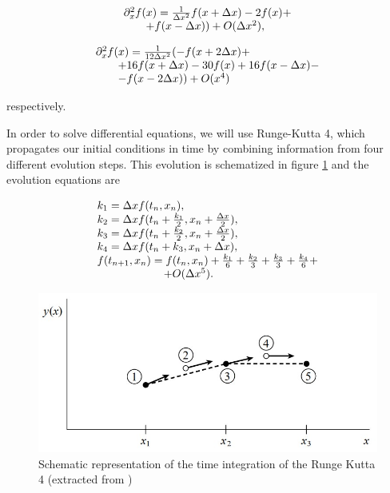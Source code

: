 \begin{align}
    \begin{array}{@{}l@{}}
        \partial_x^2 f(x) = \frac{1}{\Delta x^2}f(x+\Delta x) - 2f(x) + \\ \qquad + f(x-\Delta x)) + O(\Delta x^2),
    \end{array}
    \label{eq:second_deriv_2nd}
\end{align}

\begin{align}
     \begin{array}{@{}l@{}}
         \partial^2_x f(x) = \frac{1}{12 \Delta x^2} (-f(x+2\Delta x) + \\ \qquad + 16 f(x+\Delta x) - 30f(x) + 16f(x-\Delta x) -\\ \qquad - f(x-2\Delta x)) + O(x^4)
     \end{array}
    \label{eq:second_deriv_4th}
\end{align}

\noindent
respectively. \cite{numerical_relativity}

In order to solve differential equations, we will use Runge-Kutta 4, which propagates our initial conditions in time by combining information from four different evolution steps. \cite{numerical_recipes} This evolution is schematized in figure \ref{fig:rk4} and the evolution equations are 

\begin{align}
    \begin{array}{@{}l@{}} 
        k_1 = \Delta x f(t_n,x_n),
        \\
        k_2 = \Delta x f(t_n + \frac{k_1}{2}, x_n + \frac{\Delta x}{2}),
        \\
        k_3 = \Delta x f(t_n + \frac{k_2}{2}, x_n + \frac{\Delta x}{2}),
        \\
        k_4 = \Delta x f(t_n + k_3, x_n + \Delta x),
        \\
        f(t_{n+1},x_n) = f(t_n,x_n) + \frac{k_1}{6}+\frac{k_2}{3}+\frac{k_3}{3}+\frac{k_4}{6} + \\ \qquad \qquad \qquad + O(\Delta x^5).
    \end{array}
    \label{eq:rk4}
\end{align}

\begin{figure}[t!]
    \centering
    \includegraphics[width=\columnwidth]{Images/rk4.jpg}
    \caption{Schematic representation of the time integration of the Runge Kutta 4 (extracted from \cite{numerical_recipes})}
    \label{fig:rk4}
\end{figure}

